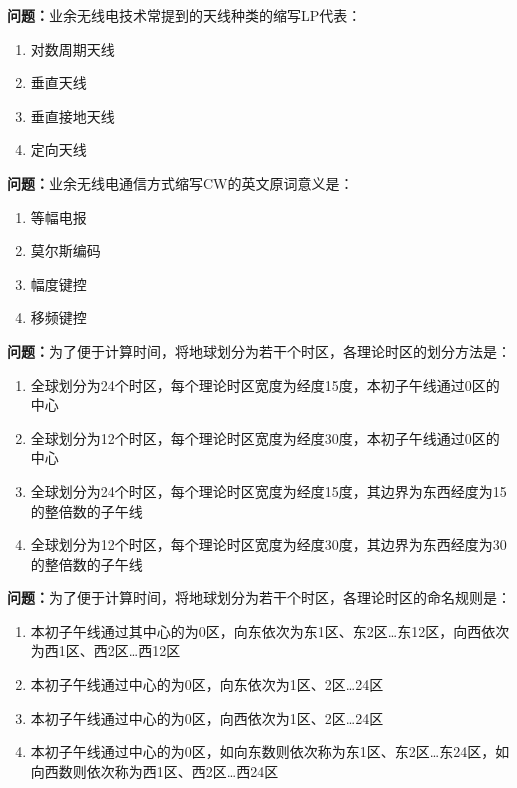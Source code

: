 \bigskip


\noindent\textbf{问题：}业余无线电技术常提到的天线种类的缩写LP代表：
\begin{enumerate}[label=\Alph*), leftmargin=3em]
\item 对数周期天线
\item 垂直天线
\item 垂直接地天线
\item 定向天线
\end{enumerate}

\bigskip


\noindent\textbf{问题：}业余无线电通信方式缩写CW的英文原词意义是：
\begin{enumerate}[label=\Alph*), leftmargin=3em]
\item 等幅电报
\item 莫尔斯编码
\item 幅度键控
\item 移频键控
\end{enumerate}

\bigskip


\noindent\textbf{问题：}为了便于计算时间，将地球划分为若干个时区，各理论时区的划分方法是：
\begin{enumerate}[label=\Alph*), leftmargin=3em]
\item 全球划分为24个时区，每个理论时区宽度为经度15度，本初子午线通过0区的中心
\item 全球划分为12个时区，每个理论时区宽度为经度30度，本初子午线通过0区的中心
\item 全球划分为24个时区，每个理论时区宽度为经度15度，其边界为东西经度为15的整倍数的子午线
\item 全球划分为12个时区，每个理论时区宽度为经度30度，其边界为东西经度为30的整倍数的子午线
\end{enumerate}

\bigskip


\noindent\textbf{问题：}为了便于计算时间，将地球划分为若干个时区，各理论时区的命名规则是：
\begin{enumerate}[label=\Alph*), leftmargin=3em]
\item 本初子午线通过其中心的为0区，向东依次为东1区、东2区…东12区，向西依次为西1区、西2区…西12区
\item 本初子午线通过中心的为0区，向东依次为1区、2区…24区
\item 本初子午线通过中心的为0区，向西依次为1区、2区…24区
\item 本初子午线通过中心的为0区，如向东数则依次称为东1区、东2区…东24区，如向西数则依次称为西1区、西2区…西24区
\end{enumerate}

